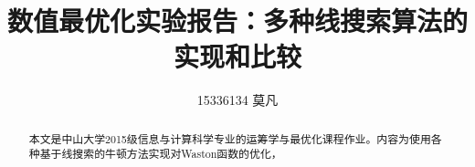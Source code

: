 \documentclass[11pt, a4paper]{article}
\begin{document}
\title{数值最优化实验报告：多种线搜索算法的实现和比较}
\author{15336134 莫凡}
\maketitle
\begin{abstract}
	本文是中山大学2015级信息与计算科学专业的运筹学与最优化课程作业\cite{高立2014数}。内容为使用各种基于线搜索的牛顿方法实现对Waston函数\cite{More:1981:TUO:355934.355936}的优化，
\end{abstract}
\newpage
\tableofcontents

\newpage


\end{document}
